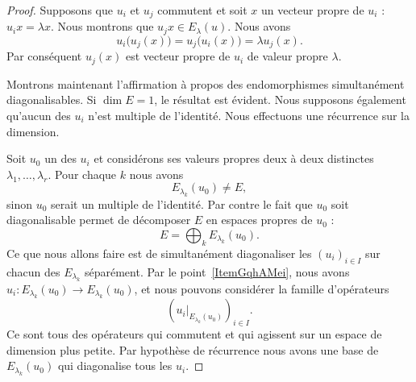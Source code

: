 \begin{proof}
    Supposons que \( u_i\) et \( u_j\) commutent et soit \( x\) un vecteur propre de \( u_i\) : \( u_ix=\lambda x\). Nous montrons que \( u_jx\in E_{\lambda}(u)\). Nous avons
    \begin{equation}
        u_i\big( u_j(x) \big)=u_j\big( u_i(x) \big)=\lambda u_j(x).
    \end{equation}
    Par conséquent \( u_j(x)\) est vecteur propre de \( u_i\) de valeur propre \( \lambda\).

    Montrons maintenant l'affirmation à propos des endomorphismes simultanément diagonalisables. Si \( \dim E=1\), le résultat est évident. Nous supposons également qu'aucun des \( u_i\) n'est multiple de l'identité. Nous effectuons une récurrence sur la dimension.

    Soit \( u_0\) un des \( u_i\) et considérons ses valeurs propres deux à deux distinctes \( \lambda_1,\ldots, \lambda_r\). Pour chaque \( k\) nous avons
    \begin{equation}
        E_{\lambda_k}(u_0)\neq E,
    \end{equation}
    sinon \( u_0\) serait un multiple de l'identité. Par contre le fait que \( u_0\) soit diagonalisable permet de décomposer \( E\) en espaces propres de \( u_0\) :
    \begin{equation}
        E=\bigoplus_{k}E_{\lambda_k}(u_0).
    \end{equation}
    Ce que nous allons faire est de simultanément diagonaliser les \( (u_i)_{i\in I}\) sur chacun des \( E_{\lambda_k}\) séparément. Par le point~\ref{ItemGqhAMei}, nous avons \( u_i\colon E_{\lambda_k}(u_0)\to E_{\lambda_k}(u_0)\), et nous pouvons considérer la famille d'opérateurs
    \begin{equation}
        \left( u_i|_{E_{\lambda_k}(u_0)} \right)_{i\in I}.
    \end{equation}
    Ce sont tous des opérateurs qui commutent et qui agissent sur un espace de dimension plus petite. Par hypothèse de récurrence nous avons une base de \( E_{\lambda_k}(u_0)\) qui diagonalise tous les \( u_i\).
\end{proof}

